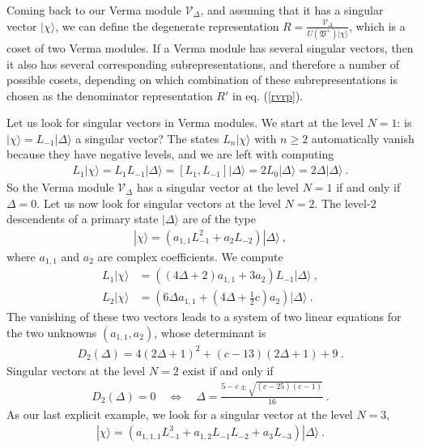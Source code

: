 \documentclass[12pt,a4paper,notitlepage]{report}
\numberwithin{equation}{section}
\theoremstyle{break}
\begin{document}
Coming back to our Verma module $\mathcal{V}_\Delta$, and assuming that it has a singular vector $|\chi\rangle$, we can define the degenerate representation $R = \frac{\mathcal{V}_\Delta}{U(\mathfrak{V}^+)|\chi\rangle}$, which is a coset of two Verma modules. If a Verma module has several singular vectors, then it also has several corresponding subrepresentations, and therefore a number of possible cosets, depending on which combination of these subrepresentations is chosen as the denominator representation $R'$ in eq. (\ref{rvrp}).

Let us look for singular vectors in Verma modules. We start at the level $N=1$: is $|\chi\rangle=L_{-1}|\Delta\rangle$ a singular vector? The states $L_n|\chi\rangle$ with $n\geq 2$ automatically vanish because they have negative levels, and we are left with computing
\begin{align}
 L_1|\chi\rangle = L_1 L_{-1}|\Delta\rangle = [L_1,L_{-1}]|\Delta\rangle = 2L_0 |\Delta\rangle = 2\Delta|\Delta\rangle\ .
\end{align}
So the Verma module $\mathcal{V}_\Delta$ has a singular vector at the level $N=1$ if and only if $\Delta = 0$.
Let us now look for singular vectors at the level $N=2$. The level-$2$ descendents of a primary state $|\Delta\rangle$ are of the type
\begin{align}
 |\chi\rangle = \left(a_{1,1} L_{-1}^2 + a_2 L_{-2}\right) |\Delta\rangle\ ,
\end{align}
where $a_{1,1}$ and $a_2$ are complex coefficients. We compute 
\begin{align}
 L_1|\chi\rangle &= \left((4\Delta+2)a_{1,1} + 3a_2\right) L_{-1}|\Delta\rangle\ ,
\\
L_2 |\chi \rangle &= \left(6\Delta a_{1,1}+(4\Delta+\tfrac12 c) a_2\right)|\Delta\rangle\ .
\end{align}
The vanishing of these two vectors leads to a system of two linear equations for the two unknowns $(a_{1,1},a_2)$, whose determinant is 
\begin{align}
 D_2(\Delta) = 4(2\Delta+1)^2 +(c-13)(2\Delta+1) +9\ . 
\label{dud}
\end{align}
Singular vectors at the level $N=2$ exist if and only if
\begin{align}
D_2(\Delta)=0 \quad \Leftrightarrow \quad \Delta = \frac{5-c\pm \sqrt{(c-25)(c-1)}}{16}\ .
\label{dcscc}
\end{align}
As our last explicit example, we look for a singular vector at the level $N=3$,
\begin{align}
 |\chi\rangle = \left(a_{1,1,1} L_{-1}^3 + a_{1,2}L_{-1}L_{-2} + a_3 L_{-3}\right) |\Delta\rangle\ .
\end{align}
\end{document}
